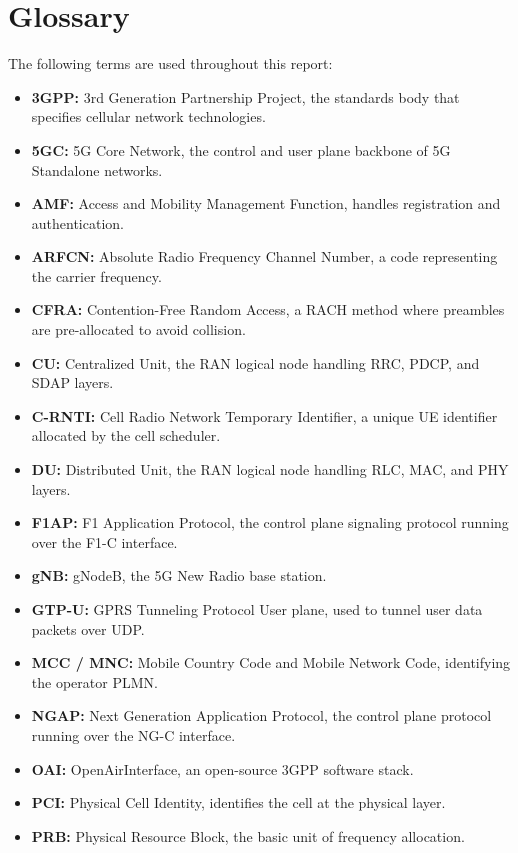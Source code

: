\section{Glossary}
\justify
The following terms are used throughout this report:
\begin{itemize}[leftmargin=*]
    \item \textbf{3GPP:} 3rd Generation Partnership Project, the standards body that specifies cellular network technologies.
    \item \textbf{5GC:} 5G Core Network, the control and user plane backbone of 5G Standalone networks.
    \item \textbf{AMF:} Access and Mobility Management Function, handles registration and authentication.
    \item \textbf{ARFCN:} Absolute Radio Frequency Channel Number, a code representing the carrier frequency.
    \item \textbf{CFRA:} Contention-Free Random Access, a RACH method where preambles are pre-allocated to avoid collision.
    \item \textbf{CU:} Centralized Unit, the RAN logical node handling RRC, PDCP, and SDAP layers.
    \item \textbf{C-RNTI:} Cell Radio Network Temporary Identifier, a unique UE identifier allocated by the cell scheduler.
    \item \textbf{DU:} Distributed Unit, the RAN logical node handling RLC, MAC, and PHY layers.
    \item \textbf{F1AP:} F1 Application Protocol, the control plane signaling protocol running over the F1-C interface.
    \item \textbf{gNB:} gNodeB, the 5G New Radio base station.
    \item \textbf{GTP-U:} GPRS Tunneling Protocol User plane, used to tunnel user data packets over UDP.
    \item \textbf{MCC / MNC:} Mobile Country Code and Mobile Network Code, identifying the operator PLMN.
    \item \textbf{NGAP:} Next Generation Application Protocol, the control plane protocol running over the NG-C interface.
    \item \textbf{OAI:} OpenAirInterface, an open-source 3GPP software stack.
    \item \textbf{PCI:} Physical Cell Identity, identifies the cell at the physical layer.
    \item \textbf{PRB:} Physical Resource Block, the basic unit of frequency allocation.

\end{itemize}
